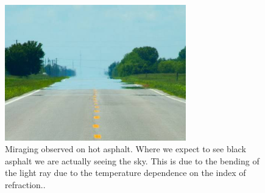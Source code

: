 \documentclass[12pt,twoside]{article}
\begin{document}
\begin{figure}
  \centering
  \includegraphics[width=0.7\textwidth]{../figures/picture.jpg}
  \caption{Miraging observed on hot asphalt. Where we expect to see black asphalt we are actually seeing the sky. This is due to the bending of the light ray due to the temperature dependence on the index of refraction..}
  \label{fig:2d2}
\end{figure}
%
%
\end{document}
